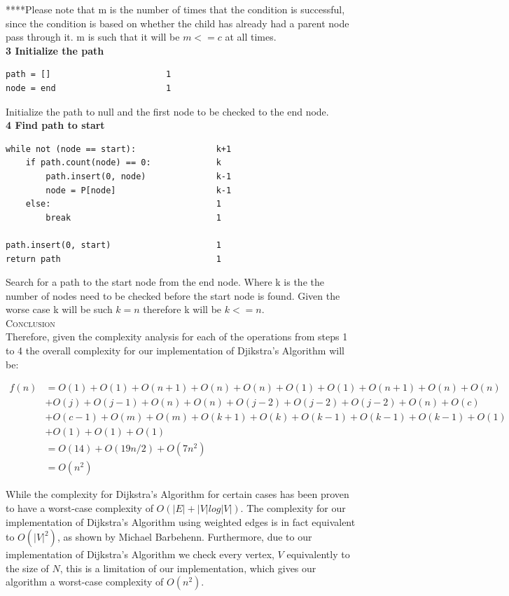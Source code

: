 \documentclass[pdftex,12pt,a4paper]{article}
\newcommand{\nspace}{\\[0.25cm]}
\newcommand{\lspace}{\\[0.50cm]}
\begin{document}
****Please note that m is the number of times that the condition is successful, since the condition is based on whether the child has already had a parent node pass through it. m is such that it will be $m <= c$ at all times.\lspace


{\bf \large 3 Initialize the path}
\begin{verbatim}
path = []						1
node = end						1
\end{verbatim}

Initialize the path to null and the first node to be checked to the end node.\lspace

{\bf \large 4 Find path to start}
\begin{verbatim}
while not (node == start):                k+1                        
    if path.count(node) == 0:             k
        path.insert(0, node)              k-1
        node = P[node]                    k-1
    else:                                 1
        break                             1

path.insert(0, start)                     1
return path                               1
\end{verbatim}

Search for a path to the start node from the end node. Where k is the the number of nodes need to be checked before the start node is found. Given the worse case k will be such $k = n$ therefore k will be $k <= n$.\lspace




\textsc{\Large Conclusion} \hfill \nspace

Therefore, given the complexity analysis for each of the operations from steps 1 to 4 the overall complexity for our implementation of Djikstra's Algorithm will be:

\begin{equation}
\begin{split}
f(n) &= O(1) + O(1) + O(n+1) + O(n) + O(n) + O(1) + O(1) + O(n+1) + O(n) + O(n)\\
     &+ O(j)+  O(j-1) +  O(n) +  O(n) +  O(j-2) + O(j-2) + O(j-2) + O(n) + O(c)\\
     &+ O(c-1) + O(m) + O(m) + O(k+1) + O(k) + O(k-1) + O(k-1) + O(k-1) + O(1)\\
     &+ O(1) + O(1) + O(1)\\
     &= O(14) + O(19n/2) + O(7n^2)\\
     &= O(n^2)
\end{split}
\end{equation}

While the complexity for Dijkstra's Algorithm for certain cases has been proven to have a worst-case complexity of $O(|E| + |V| log |V|) $\cite{cormen2001introduction}. The complexity for our implementation of Dijkstra's Algorithm using weighted edges is in fact equivalent to $O(|V|^2)$\cite{barbehenn1998note}, as shown by Michael Barbehenn. Furthermore, due to our implementation of Dijkstra's Algorithm we check every vertex, $V$ equivalently to the size of $N$, this is a limitation of our implementation, which gives our algorithm a worst-case complexity of $O(n^2)$.



\end{document}
